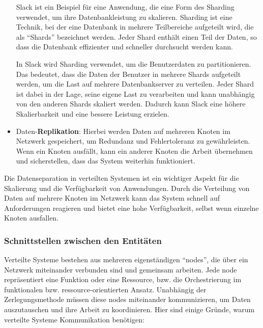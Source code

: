 \begin{itemize}
Slack ist ein Beispiel für eine Anwendung, die eine Form des Sharding verwendet, um ihre Datenbankleistung zu skalieren. Sharding ist eine Technik, bei der eine Datenbank in mehrere Teilbereiche aufgeteilt wird, die als \enquote{Shards} bezeichnet werden. Jeder Shard enthält einen Teil der Daten, so dass die Datenbank effizienter und schneller durchsucht werden kann.

In Slack wird Sharding verwendet, um die Benutzerdaten zu partitionieren. Das bedeutet, dass die Daten der Benutzer in mehrere Shards aufgeteilt werden, um die Last auf mehrere Datenbankserver zu verteilen. Jeder Shard ist dabei in der Lage, seine eigene Last zu verarbeiten und kann unabhängig von den anderen Shards skaliert werden. Dadurch kann Slack eine höhere Skalierbarkeit und eine bessere Leistung erzielen.
\item Daten-\textbf{Replikation}: Hierbei werden Daten auf mehreren Knoten im Netzwerk gespeichert, um Redundanz und Fehlertoleranz zu gewährleisten. Wenn ein Knoten ausfällt, kann ein anderer Knoten die Arbeit übernehmen und sicherstellen, dass das System weiterhin funktioniert.
\end{itemize}
Die Datenseparation in verteilten Systemen ist ein wichtiger Aspekt für die Skalierung und die Verfügbarkeit von Anwendungen. Durch die Verteilung von Daten auf mehrere Knoten im Netzwerk kann das System schnell auf Anforderungen reagieren und bietet eine hohe Verfügbarkeit, selbst wenn einzelne Knoten ausfallen.

\subsubsection{Schnittstellen zwischen den Entitäten}

Verteilte Systeme bestehen aus mehreren eigenständigen \enquote{nodes}, die über ein Netzwerk miteinander verbunden sind und gemeinsam arbeiten. Jede node repräsentiert eine Funktion oder eine Ressource, bzw. die Orchestrierung im funktionalen bzw. ressource-orientierten Ansatz. Unabhängig der Zerlegungsmethode müssen diese nodes miteinander kommunizieren, um Daten auszutauschen und ihre Arbeit zu koordinieren. Hier sind einige Gründe, warum verteilte Systeme Kommunikation benötigen:

